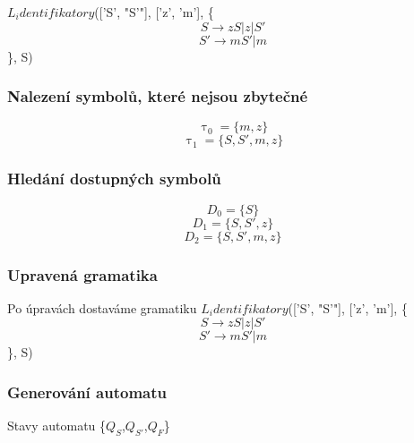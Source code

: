 $L_identifikatory$(['S', "S'"], ['z', 'm'], \{
$$S \rightarrow zS|z|S'$$$$S' \rightarrow mS'|m$$\},
S)

\subsubsection{Nalezení symbolů, které nejsou zbytečné}$$\uptau_0 = \{m,z\}$$$$\uptau_1 = \{S,S',m,z\}$$\subsubsection{Hledání dostupných symbolů}$$D_0 = \{S\}$$$$D_1 = \{S,S',z\}$$$$D_2 = \{S,S',m,z\}$$\subsubsection{Upravená gramatika}
Po úpravách dostaváme gramatiku
$L_identifikatory$(['S', "S'"], ['z', 'm'], \{
$$S \rightarrow zS|z|S'$$$$S' \rightarrow mS'|m$$\},
S)

\subsubsection{Generování automatu}
Stavy automatu \{$Q_{S}$,$Q_{S'}$,$Q_{F}$\}
